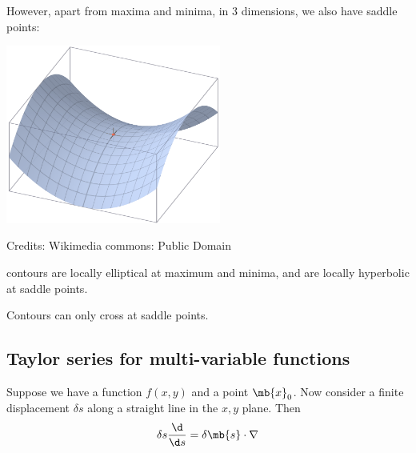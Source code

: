 \documentclass[a4paper]{article}
\begin{document}
However, apart from maxima and minima, in 3 dimensions, we also have saddle points:

\begin{center}
  \includegraphics[width=200pt]{images/de_22.png}

  Credits: Wikimedia commons: Public Domain
\end{center}

\note contours are locally elliptical at maximum and minima, and are locally hyperbolic at saddle points.

\note Contours can only cross at saddle points.
\subsection{Taylor series for multi-variable functions}
Suppose we have a function $f(x, y)$ and a point $\mb{x}_0$. Now consider a finite displacement $\delta s$ along a straight line in the $x,y$ plane. Then
\[
\delta s\frac{\d }{\d s} = \delta \mb{s}\cdot \nabla
\]
\end{document}
